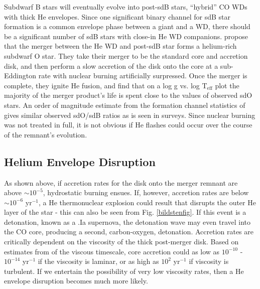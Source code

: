 Subdwarf B stars will eventually evolve into post-sdB stars, ``hybrid'' CO WDs with thick He envelopes.  Since one significant binary channel for sdB star formation is a common envelope phase between a giant and a WD, there should be a significant number of sdB stars with close-in He WD companions.  \cite{justph11} propose that the merger between the He WD and post-sdB star forms a helium-rich subdwarf O star.  They take their merger to be the standard core and accretion disk, and then perform a slow accretion of the disk onto the core at a sub-Eddington rate with nuclear burning artificially surpressed.  Once the merger is complete, they ignite He fusion, and find that on a log g vs. log T$_{\mathrm{eff}}$ plot the majority of the merger product's life is spent close to the values of observed sdO stars.  An order of magnitude estimate from the formation channel statistics of \cite{han+03} gives similar observed sdO/sdB ratios as is seen in surveys.  Since nuclear burning was not treated in full, it is not obvious if He flashes could occur over the course of the remnant's evolution.


\subsection{Helium Envelope Disruption}
\label{ssec:heliumenvelopedisruption}

As shown above, if accretion rates for the disk onto the merger remnant are above $\sim 10^{-5}$, hydrostatic burning ensues.  If, however, accretion rates are below $\sim 10^{-6}$ {\Msun} yr$^{-1}$, a He thermonuclear explosion could result that disrupts the outer He layer of the star - this can also be seen from Fig. \ref{bildstenfig}.  If this event is a detonation, known as a .Ia supernova, the detonation wave may even travel into the CO core, producing a second, carbon-oxygen, detonation.  Accretion rates are critically dependent on the viscosity of the thick post-merger disk.  Based on estimates from \citeauthor{loreig09} of the viscous timescale, core accretion could as low as $10^{-10}$ - $10^{-14}$ {\Msun} yr$^{-1}$ if the viscosity is laminar, or as high as $10^2$ {\Msun} yr$^{-1}$ if viscosity is turbulent.  If we entertain the possibility of very low viscosity rates, then a He envelope disruption becomes much more likely.

